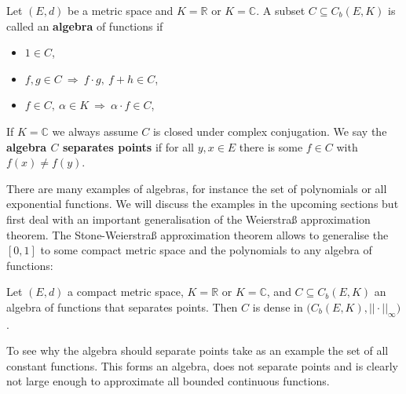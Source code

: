 \begin{ldef}
\begin{deff}\label{def_separating_points}
	Let $(E,d)$ be a metric space and $K = \mathbb{R}$ or $K = \mathbb{C}$. A subset $C \subseteq C_b(E,K)$ is called an \textbf{algebra} of functions if
	\begin{itemize}
		\item $1 \in C$,
		\item $f,g\in C \: \Rightarrow \: f\cdot g, \: f+h \in C$,
		\item $f\in C, \: \alpha \in K \: \Rightarrow \: \alpha \cdot f \in C$,
	\end{itemize}
	 If $K = \mathbb{C}$ we always assume $C$ is closed under complex conjugation. We say the \textbf{algebra $C$ separates points} if for all $y,x\in E$ there is some $f\in C$ with $f(x) \neq f(y)$.
\end{deff}
\end{ldef}
There are many examples of algebras, for instance the set of polynomials or all exponential functions. We will discuss the examples in the upcoming sections but first deal with an important generalisation of the Weierstra\ss{} approximation theorem. The Stone-Weierstra\ss{} approximation theorem allows to generalise the $[0,1]$ to some compact metric space and the polynomials to any algebra of functions:
\begin{lsatzwichtig}	
\begin{theorem}\label{Stone_weierstrass}
	Let $(E,d)$ a compact metric space, $K = \mathbb{R}$ or $K = \mathbb{C}$, and $C \subseteq C_b(E, K ) $ an algebra of functions that separates points.
	Then $C$ is dense in $\big( C_b(E,K), ||\cdot||_\infty \big)$.
\end{theorem}
\end{lsatzwichtig}
To see why the algebra should separate points take as an example the set of all constant functions. This forms an algebra, does not separate points and is clearly not large enough to approximate all bounded continuous functions.

